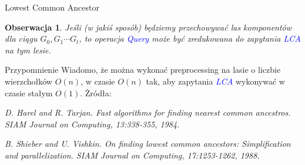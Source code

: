 \documentclass{beamer}
\newtheorem{obs}{Obserwacja}
\newcommand{\emp}[1]{\textcolor{blue}{\textit{#1}}}
\begin{document}

\begin{frame}{Lowest Common Ancestor}
\begin{obs}
Jeśli (w jakiś sposób) będziemy przechowywać las komponentów dla ciągu $G_0,G_1 \cdots G_t$, to operacja \emp{Query} może być zredukowana do zapytania \emp{LCA} na tym lesie.
\end{obs}

\begin{block}{Przypomnienie}
Wiadomo, że można wykonać preprocessing na lasie o liczbie wierzchołków \alert{$O(n)$}, w czasie \alert{$O(n)$} tak, aby zapytania \emp{LCA} wykonywać w czasie stałym \alert{$O(1)$}. Żródła:

\vspace{0.1cm}
{\small\textit{D. Harel and R. Tarjan. Fast algorithms for finding nearest common ancestros. SIAM Journal on Computing, 13:338-355, 1984.}}

\vspace{0.1cm}
{\small\textit{B. Shieber and U. Vishkin. On finding lowest common ancestors: Simplification and parallelization. SIAM Journal on Computing, 17:1253-1262, 1988.}}
\end{block}
\end{frame}
\end{document}
